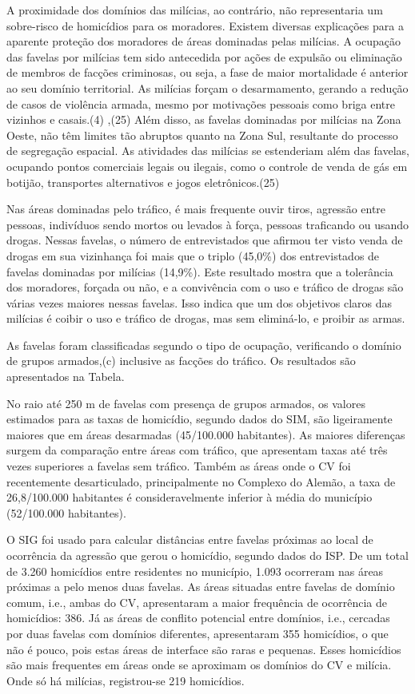 \documentclass{article}
\begin{document}
A proximidade dos domínios das milícias, ao contrário, não representaria um
sobre-risco de homicídios para os moradores. Existem diversas explicações para a
aparente proteção dos moradores de áreas dominadas pelas milícias. A ocupação
das favelas por milícias tem sido antecedida por ações de expulsão ou eliminação
de membros de facções criminosas, ou seja, a fase de maior mortalidade é
anterior ao seu domínio territorial. As milícias forçam o desarmamento, gerando
a redução de casos de violência armada, mesmo por motivações pessoais como briga
entre vizinhos e casais.(4)
,(25)
Além disso, as favelas dominadas por milícias na Zona Oeste, não têm limites tão
abruptos quanto na Zona Sul, resultante do processo de segregação espacial. As
atividades das milícias se estenderiam além das favelas, ocupando pontos
comerciais legais ou ilegais, como o controle de venda de gás em botijão,
transportes alternativos e jogos eletrônicos.(25)

Nas áreas dominadas pelo tráfico, é mais frequente ouvir tiros, agressão entre
pessoas, indivíduos sendo mortos ou levados à força, pessoas traficando ou
usando drogas. Nessas favelas, o número de entrevistados que afirmou ter visto
venda de drogas em sua vizinhança foi mais que o triplo (45,0\%) dos
entrevistados de favelas dominadas por milícias (14,9\%). Este resultado mostra
que a tolerância dos moradores, forçada ou não, e a convivência com o uso e
tráfico de drogas são várias vezes maiores nessas favelas. Isso indica que um
dos objetivos claros das milícias é coibir o uso e tráfico de drogas, mas sem
eliminá-lo, e proibir as armas.

As favelas foram classificadas segundo o tipo de ocupação, verificando o domínio
de grupos armados,(c)
inclusive as facções do tráfico. Os resultados são apresentados na Tabela.

No raio até 250 m de favelas com presença de grupos armados, os valores
estimados para as taxas de homicídio, segundo dados do SIM, são ligeiramente
maiores que em áreas desarmadas (45/100.000 habitantes). As maiores diferenças
surgem da comparação entre áreas com tráfico, que apresentam taxas até três
vezes superiores a favelas sem tráfico. Também as áreas onde o CV foi
recentemente desarticulado, principalmente no Complexo do Alemão, a taxa de
26,8/100.000 habitantes é consideravelmente inferior à média do município
(52/100.000 habitantes).

O SIG foi usado para calcular distâncias entre favelas próximas ao local de
ocorrência da agressão que gerou o homicídio, segundo dados do ISP. De um total
de 3.260 homicídios entre residentes no município, 1.093 ocorreram nas áreas
próximas a pelo menos duas favelas. As áreas situadas entre favelas de domínio
comum, i.e., ambas do CV, apresentaram a maior frequência de ocorrência de
homicídios: 386. Já as áreas de conflito potencial entre domínios, i.e.,
cercadas por duas favelas com domínios diferentes, apresentaram 355 homicídios,
o que não é pouco, pois estas áreas de interface são raras e pequenas. Esses
homicídios são mais frequentes em áreas onde se aproximam os domínios do CV e
milícia. Onde só há milícias, registrou-se 219 homicídios.
\end{document}

